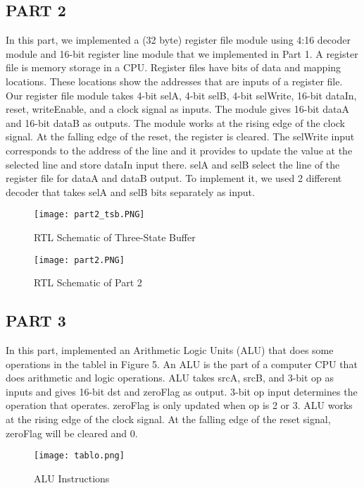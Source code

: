 \documentclass[pdftex,12pt,a4paper]{article}
\begin{document}
\subsection{PART 2}
In this part, we implemented a (32 byte) register file module using 4:16 decoder module and 16-bit register line module that we implemented in Part 1. A register file is memory storage in a CPU. Register files have bits of data and mapping locations. These locations show the addresses that are inputs of a register file. Our register file module takes 4-bit selA, 4-bit selB, 4-bit selWrite, 16-bit dataIn, reset, writeEnable, and a clock signal as inputs. The module gives 16-bit dataA and 16-bit dataB as outputs. The module works at the rising edge of the clock signal. At the falling edge of the reset, the register is cleared. The selWrite input corresponds to the address of the line and it provides to update the value at the selected line and store dataIn input there. selA and selB select the line of the register file for dataA and dataB output. To implement it, we used 2 different decoder that takes selA and selB bits separately as input.

\begin{figure}[ht]
	\centering
	\texttt{[image: part2\_tsb.PNG]}	
	\caption{RTL Schematic of Three-State Buffer}
	\label{fig1}
\end{figure}

\begin{figure}[ht]
	\centering
	\texttt{[image: part2.PNG]}	
	\caption{RTL Schematic of Part 2}
	\label{fig1}
\end{figure}


\clearpage

\subsection{PART 3}
In this part, implemented an Arithmetic Logic Units (ALU) that does some operations in the tablel in Figure 5. An ALU is the part of a computer CPU that does arithmetic and logic operations.  ALU takes srcA, srcB, and 3-bit op as inputs and gives 16-bit dst and zeroFlag as output. 3-bit op input determines the operation that operates. zeroFlag is only updated when op is 2 or 3. ALU works at the rising edge of the clock signal. At the falling edge of the reset signal, zeroFlag will be cleared and 0.\\

\begin{figure}[ht]
	\centering
	\texttt{[image: tablo.png]}	
	\caption{ALU Instructions}
	\label{fig1}
\end{figure}
\end{document}
